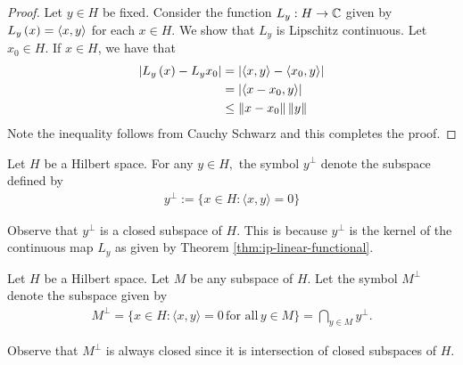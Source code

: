 \begin{proof}
    Let $y\in H$ be fixed. Consider the function $L_{y} : H \to \mathbb C$ given by $L_{y} \left( x \right) = \left\langle x,y \right\rangle$ for each $x \in H$. We show that $L_{y}$ is Lipschitz continuous.
    Let $x_0 \in H$. If $x\in H$, we have that
    \begin{align*}
	\left\lvert L_{y} \left( x \right) - L_{y} x_{0} \right\rvert &= \left\lvert \left\langle x,y \right\rangle-\left\langle x_{0},y \right\rangle \right\rvert	\\
	&= \left\lvert \left\langle x-x_{0},y \right\rangle \right\rvert \\
	& \le \left\lVert x-x_{0} \right\rVert \left\lVert y \right\rVert
    \end{align*}
    Note the inequality follows from Cauchy Schwarz and this completes the proof.
\end{proof}

\begin{definition}
    Let $H$ be a Hilbert space. For any $y\in H,$ the symbol $y^{\perp}$ denote the subspace defined by
\begin{align*}
    y^{\perp}:= \{x\in H : \langle x,y\rangle=0\}
    \label{def:orthonormal-of-subspace}
\end{align*}
\end{definition}

Observe that $y^{\perp}$ is a closed subspace of $H$. This is because $y^{\perp}$ is the kernel of the continuous map $L_{y}$ as given by Theorem \ref{thm:ip-linear-functional}.

\begin{definition}
    Let $H$ be a Hilbert space. Let $M$ be any subspace of $H$. Let the symbol $M^{\perp}$ denote the subspace given by 
   \begin{align*}
M^{\perp} = \{x\in H : \langle x,y\rangle =0\,\mbox{for all}\,y\in M\}= \bigcap_{y\in M} y^{\perp}.  \end{align*} 

\end{definition}

Observe that $M^{\perp}$ is always closed since it is intersection of closed subspaces of $H$.

